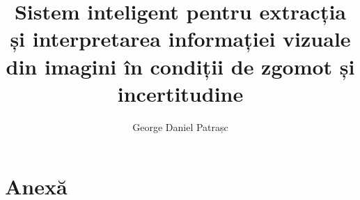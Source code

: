 \documentclass[12pt, a4paper, oneside, romanian]{teza-upb}
\begin{document}
\nocite{szeliski2010}
\nocite{gonzalez2018}
\nocite{bradski2008}
\nocite{goodfellow2016}
\nocite{bishop2006}
\nocite{haykin2009}
\nocite{chollet2017}

\nocite{he2016resnet}
\nocite{otsu1979}
\nocite{canny1986}
\nocite{tesseract}

\nocite{opencvdocs}
\nocite{pytorchdocs}
\nocite{qt}
\nocite{cmake}
\nocite{docker}
\nocite{postgresql}
\nocite{boost}
\nocite{openssl}
\nocite{angular}

\author{George Daniel Patrașc}
\title{Sistem inteligent pentru extracția și interpretarea informației vizuale din imagini în condiții de zgomot și incertitudine}



\beforepreface

\afterpreface







\nocite{*}



\chapter{Anexă}

\setlength{\tabcolsep}{4pt}
\end{document}
